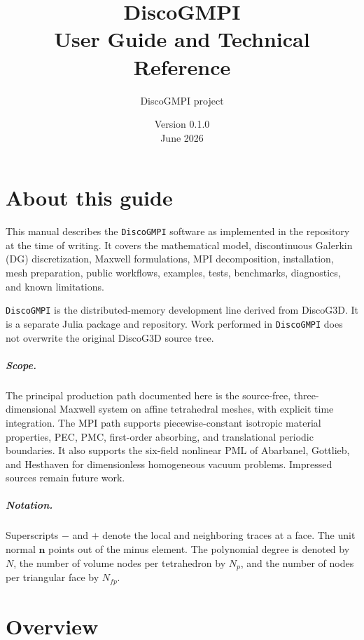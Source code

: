 \documentclass[11pt,oneside]{book}
\title{\Huge DiscoGMPI\\[0.5em]\Large User Guide and Technical Reference}
\author{DiscoGMPI project}
\date{Version 0.1.0\\June 2026}
\newcommand{\pkg}{\texttt{DiscoGMPI}}
\newcommand{\vect}[1]{\boldsymbol{#1}}
\begin{document}
\frontmatter
\hypersetup{pageanchor=false}
\maketitle
\hypersetup{pageanchor=true}
\setcounter{page}{1}

\chapter*{About this guide}

This manual describes the \pkg{} software as implemented in the repository at
the time of writing. It covers the mathematical model, discontinuous Galerkin
(DG) discretization, Maxwell formulations, MPI decomposition, installation,
mesh preparation, public workflows, examples, tests, benchmarks, diagnostics,
and known limitations.

\pkg{} is the distributed-memory development line derived from DiscoG3D. It is
a separate Julia package and repository. Work performed in \pkg{} does not
overwrite the original DiscoG3D source tree.

\paragraph{Scope.}
The principal production path documented here is the source-free,
three-dimensional Maxwell system on affine tetrahedral meshes, with explicit
time integration. The MPI path supports piecewise-constant isotropic material
properties, PEC, PMC, first-order absorbing, and translational periodic
boundaries. It also supports the six-field nonlinear PML of Abarbanel,
Gottlieb, and Hesthaven for dimensionless homogeneous vacuum problems.
Impressed sources remain future work.

\paragraph{Notation.}
Superscripts $-$ and $+$ denote the local and neighboring traces at a face.
The unit normal $\vect n$ points out of the minus element. The polynomial
degree is denoted by $N$, the number of volume nodes per tetrahedron by
$N_p$, and the number of nodes per triangular face by $N_{fp}$.

\tableofcontents
\listoftables

\mainmatter

\chapter{Overview}
\end{document}
